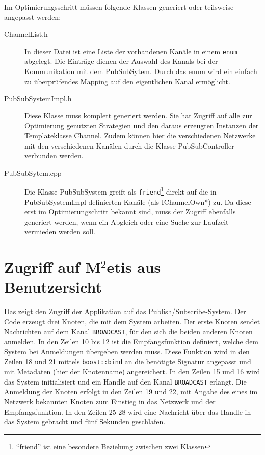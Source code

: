 Im Optimierungsschritt müssen folgende Klassen generiert oder teilsweise angepasst werden:
\begin{description}
\item[ChannelList.h] In dieser Datei ist eine Liste der vorhandenen Kanäle in einem \texttt{enum} abgelegt. Die Einträge dienen der Auswahl des Kanals bei der Kommunikation mit dem PubSubSytem. Durch das enum wird ein einfach zu überprüfendes Mapping auf den eigentlichen Kanal ermöglicht.
\item[PubSubSystemImpl.h] Diese Klasse muss komplett generiert werden. Sie hat Zugriff auf alle zur Optimierung genutzten Strategien und den daraus erzeugten Instanzen der Templateklasse Channel. Zudem können hier die verschiedenen Netzwerke mit den verschiedenen Kanälen durch die Klasse PubSubController verbunden werden.
\item[PubSubSytem.cpp] Die Klasse PubSubSystem greift als \texttt{friend}\footnote{``friend'' ist eine besondere Beziehung zwischen zwei Klassen} direkt auf die in PubSubSystemImpl definierten Kanäle (als IChannelOwn*) zu. Da diese erst im Optimierungschritt bekannt sind, muss der Zugriff ebenfalls generiert werden, wenn ein Abgleich oder eine Suche zur Laufzeit vermieden werden soll. 
\end{description}


\section*{Zugriff auf M$^2$etis aus Benutzersicht}
Das  zeigt den Zugriff der Applikation auf das Publish/Subscribe-System. Der Code erzeugt drei Knoten, die mit dem System arbeiten. Der erste Knoten sendet Nachrichten auf dem Kanal \texttt{BROADCAST}, für den sich die beiden anderen Knoten anmelden. In den Zeilen 10 bis 12 ist die Empfangsfunktion definiert, welche dem System bei Anmeldungen übergeben werden muss. Diese Funktion wird in den Zeilen 18 und 21 mittels \texttt{boost::bind} an die benötigte Signatur angepasst und mit Metadaten (hier der Knotenname) angereichert. In den Zeilen 15 und 16 wird das System initialisiert und ein Handle auf den Kanal \texttt{BROADCAST} erlangt. Die Anmeldung der Knoten erfolgt in den Zeilen 19 und 22, mit Angabe des eines im Netzwerk bekannten Knoten zum Einstieg in das Netzwerk und der Empfangsfunktion. In den Zeilen 25-28 wird eine Nachricht über das Handle in das System gebracht und fünf Sekunden geschlafen.

